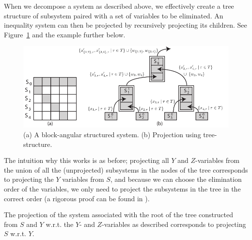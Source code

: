 \documentclass{llncs}
\begin{document}
When we decompose a system as described above, we effectively create a tree structure of subsystem paired with a set of variables to be eliminated. An inequality system can then be projected by recursively projecting its children. See Figure~\ref{fig:decomp2} and the example further below.

\begin{figure}[tb]
	\centering
		\includegraphics[scale=0.9]{figures/Example5.pdf}
	\caption{(a) A block-angular structured system. (b) Projection using tree-structure.}
	\label{fig:decomp2}
\end{figure}

The intuition why this works is as before; projecting all $Y$ and $Z$-variables from the union of all the (unprojected) subsystems in the nodes of the tree corresponds to projecting the $Y$ variables from $S$, and because we can choose the elimination order of the variables, we only need to project the subsystems in the tree in the correct order (a rigorous proof can be found in \cite{MyTechRep}).

\begin{proposition}
The projection of the system associated with the root of the tree constructed from $S$ and $Y$ w.r.t. the $Y$- and $Z$-variables as described corresponds to projecting $S$ w.r.t. $Y$.
\end{proposition}
\end{document}
